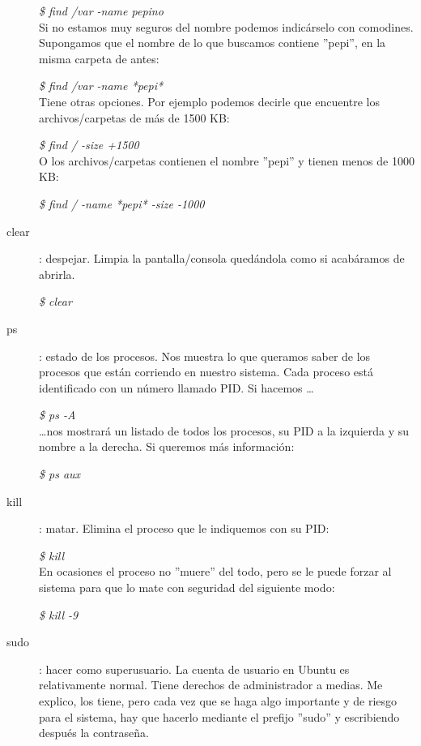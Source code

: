 \documentclass[12pt,spanish,lettersize,twocolumn]{article}
\begin{document}
\begin{description}
\emph{\$ find /var -name pepino}\\

Si no estamos muy seguros del nombre podemos indic\'arselo con comodines. Supongamos que el nombre de lo que buscamos contiene ''pepi'', en la misma carpeta de antes:

\emph{\$ find /var -name *pepi*}\\

Tiene otras opciones. Por ejemplo podemos decirle que encuentre los archivos/carpetas de m\'as de 1500 KB:

\emph{\$ find / -size +1500}\\

O los archivos/carpetas contienen el nombre ''pepi'' y tienen menos de 1000 KB:

\emph{\$ find / -name *pepi* -size -1000}\\

\item[clear]: despejar. Limpia la pantalla/consola qued\'andola como si acab\'aramos de abrirla.

\emph{\$ clear}\\

\item[ps]: estado de los procesos. Nos muestra lo que queramos saber de los procesos que est\'an corriendo en nuestro sistema. Cada proceso est\'a identificado con un número llamado PID. Si hacemos \ldots

\emph{\$ ps -A}\\

\ldots nos mostrar\'a un listado de todos los procesos, su PID a la izquierda y su nombre a la derecha. Si queremos m\'as informaci\'on:

\emph{\$ ps aux}\\

\item[kill]: matar. Elimina el proceso que le indiquemos con su PID:

\emph{\$ kill}\\

En ocasiones el proceso no ''muere'' del todo, pero se le puede forzar al sistema para que lo mate con seguridad del siguiente modo:

\emph{\$ kill -9}\\

\item[sudo]: hacer como superusuario. La cuenta de usuario en Ubuntu es relativamente normal. Tiene derechos de administrador a medias. Me explico, los tiene, pero cada vez que se haga algo importante y de riesgo para el sistema, hay que hacerlo mediante el prefijo ''sudo'' y escribiendo despu\'es la contrase\~na.


\end{description}
\end{document}
